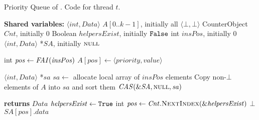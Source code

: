     \begin{algorithm}[htbp]
        \footnotesize
        \caption{Priority Queue of \Fresh. Code for thread $t$.}
        \label{alg:pq}
        \begin{algorithmic}[1]
    
            \State \textbf{Shared variables:}
            \State $\mathit{\langle int, Data \rangle}$ $A[0..k-1]$, initially all $\langle \bot, \bot \rangle$
            \State CounterObject $\mathit{Cnt}$, initially $0$
            \State Boolean $\mathit{helpersExist}$, initially $\mbox{\texttt{False}}$
            \State int $\mathit{insPos}$, initially $0$
            \State $\mathit{\langle int, Data \rangle}$ *$\mathit{SA}$, initially $\mbox{\sc null}$
    
            \vspace{2mm}
            
                \State int $\mathit{pos} \gets \mbox{\textit{FAI}}(\mathit{insPos})$ \label{alg:pq:ins:FAI}
                \State $\mathit{A[pos]} \gets \langle \mathit{priority, value} \rangle$ \label{alg:pq:ins:store}
            \EndProcedure
    
            \vspace{2mm}
    
                \State $\mathit{\langle int, Data \rangle}$ *$\mathit{sa}$
                \State $\mathit{sa} \gets$ allocate local array of $insPos$ elements
                \State Copy non-$\bot$ elements of $A$ into $\mathit{sa}$ and sort them \label{alg:sa:local-copy}
                \State $\mathit{\mbox{\textit{CAS}}(\&SA, \mbox{\sc null}, sa)}$ \label{alg:sa:CAS}
            \EndProcedure
    
            \vspace{2mm}
    
             \textbf{returns} $\mathit{Data}$
                    \State $\mathit{helpersExist} \gets \mbox{\texttt{True}}$
                \EndIf
                \State int $\mathit{pos} \gets \mathit{Cnt.\mbox{\sc NextIndex}(\&helpersExist})$ \label{alg:pq:deleteMin:next}
                    \State \Return $\bot$
                \EndIf
                \State \Return $\mathit{SA[pos].data}$
            \EndFunction
    
        \end{algorithmic}
    \end{algorithm}
    
